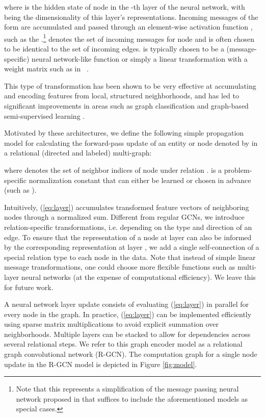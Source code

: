 \documentclass[letterpaper]{article} \usepackage{aaai18}  \usepackage{times}  \usepackage{helvet}  \usepackage{courier}  \usepackage{url}  \usepackage{graphicx}  \frenchspacing
\newcommand{\citet}[1]{\citeauthor{#1}~\shortcite{#1}}
\begin{document}
where  is the hidden state of node  in the -th layer of the neural network, with  being the dimensionality of this layer's representations. Incoming messages of the form  are accumulated and passed through an element-wise activation function , such as the .\footnote{Note that this represents a simplification of the message passing neural network proposed in \cite{gilmer2017neural} that suffices to include the aforementioned models as special cases.}  denotes the set of incoming messages for node  and is often chosen to be identical to the set of incoming edges.  is typically chosen to be a (message-specific) neural network-like function or simply a linear transformation  with a weight matrix  such as in \citet{kipf2016semi}.

This type of transformation has been shown to be very effective at accumulating and encoding features from local, structured neighborhoods, and has led to significant improvements in areas such as graph classification \cite{duvenaud2015convolutional} and graph-based semi-supervised learning \cite{kipf2016semi}.

Motivated by these architectures, we define the following simple propagation model for calculating the forward-pass update of an entity or node denoted by  in a relational (directed and labeled) multi-graph:

where  denotes the set of neighbor indices of node  under relation .  is a problem-specific normalization constant that can either be learned or chosen in advance (such as ).

Intuitively, (\ref{eq:layer}) accumulates transformed feature vectors of neighboring nodes through a normalized sum. Different from regular GCNs, we introduce relation-specific transformations, i.e. depending on the type and direction of an edge.
To ensure that the representation of a node at layer  can also be informed by the corresponding representation at layer , we add a single self-connection of a special relation type to each node in the data. Note that instead of simple linear message transformations, one could choose more flexible functions such as multi-layer neural networks (at the expense of computational efficiency). We leave this for future work.

A neural network layer update consists of evaluating (\ref{eq:layer}) in parallel for every node in the graph. In practice, (\ref{eq:layer}) can be implemented efficiently using sparse matrix multiplications to avoid explicit summation over neighborhoods. Multiple layers can be stacked to allow for dependencies across several relational steps. We refer to this graph encoder model as a relational graph convolutional network (R-GCN). The computation graph for a single node update in the R-GCN model is depicted in Figure \ref{fig:model}.
\end{document}
